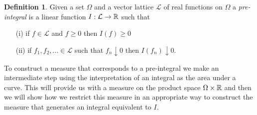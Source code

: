 \documentclass{amsart}
\theoremstyle{remark}
\theoremstyle{definition}
\newtheorem{defn}[thm]{Definition}
\begin{document}
\begin{defn}Given a set $\Omega$ and a vector lattice $\mathcal{L}$ of
  real functions on $\Omega$ a \emph{pre-integral} is a linear
  function $I : \mathcal{L} \to \mathbb{R}$ such that 
\begin{itemize}
\item[(i)]if $f \in \mathcal{L}$ and $f \geq 0$ then $I(f) \geq 0$
\item[(ii)]if $f_1, f_2, \dots \in \mathcal{L}$ such that $f_n
  \downarrow 0$ then $I(f_n) \downarrow 0$.
\end{itemize}
\end{defn}

To construct a measure that corresponds to a pre-integral we make an
intermediate step using the interpretation of an integral as the area
under a curve.  This will provide us with a measure on the product
space $\Omega \times \mathbb{R}$ and then we will show how we restrict
this measure in an appropriate way to construct the measure that
generates an integral equivalent to $I$.
\end{document}
